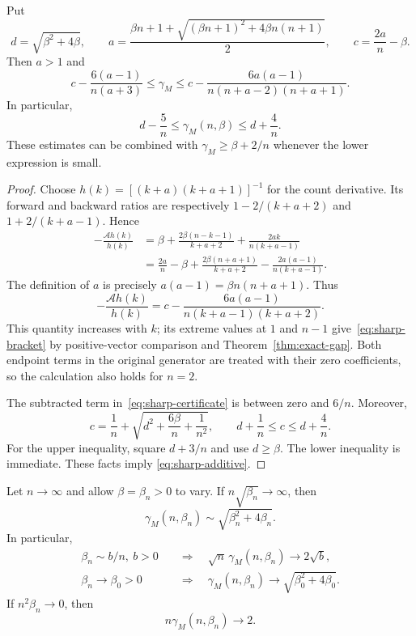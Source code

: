 \begin{theorem}
\label{thm:sharp-gap}
Put
\[
 d=\sqrt{\beta^2+4\beta},\qquad
 a=\frac{\beta n+1+
       \sqrt{(\beta n+1)^2+4\beta n(n+1)}}2,
 \qquad c=\frac{2a}{n}-\beta.
\]
Then $a>1$ and
\begin{equation}\label{eq:sharp-bracket}
 c-\frac{6(a-1)}{n(a+3)}
 \le\gamma_M
 \le c-\frac{6a(a-1)}{n(n+a-2)(n+a+1)}.
\end{equation}
In particular,
\begin{equation}\label{eq:sharp-additive}
 \boxed{\quad d-\frac5n\le\gamma_M(n,\beta)
                     \le d+\frac4n.\quad}
\end{equation}
These estimates can be combined with
$\gamma_M\ge\beta+2/n$ whenever the lower expression is small.
\end{theorem}

\begin{proof}
Choose
$h(k)=[(k+a)(k+a+1)]^{-1}$ for the count derivative.
Its forward and backward ratios are respectively
$1-2/(k+a+2)$ and $1+2/(k+a-1)$. Hence
\begin{align*}
 -\frac{\mathcal Ah(k)}{h(k)}
 &=\beta+\frac{2\beta(n-k-1)}{k+a+2}
                       +\frac{2ak}{n(k+a-1)}\\
 &=\frac{2a}{n}-\beta+
   \frac{2\beta(n+a+1)}{k+a+2}
             -\frac{2a(a-1)}{n(k+a-1)}.
\end{align*}
The definition of $a$ is precisely
$a(a-1)=\beta n(n+a+1)$. Thus
\begin{equation}\label{eq:sharp-certificate}
 -\frac{\mathcal Ah(k)}{h(k)}
 =c-\frac{6a(a-1)}
          {n(k+a-1)(k+a+2)}.
\end{equation}
This quantity increases with $k$; its extreme values at $1$ and
$n-1$ give~\eqref{eq:sharp-bracket} by positive-vector comparison
and Theorem~\ref{thm:exact-gap}. Both endpoint terms in the original
generator are treated with their zero coefficients, so the calculation
also holds for $n=2$.

The subtracted term in~\eqref{eq:sharp-certificate} is between
zero and $6/n$. Moreover,
\[
 c=\frac1n+\sqrt{d^2+\frac{6\beta}{n}+\frac1{n^2}},
 \qquad d+\frac1n\le c\le d+\frac4n.
\]
For the upper inequality, square $d+3/n$ and use $d\ge\beta$.
The lower inequality is immediate. These facts imply
\eqref{eq:sharp-additive}.
\end{proof}

\begin{corollary}\label{cor:sharp-equivalents}
Let $n\to\infty$ and allow $\beta=\beta_n>0$ to vary.
If $n\sqrt{\beta_n}\to\infty$, then
\[
 \gamma_M(n,\beta_n)\sim\sqrt{\beta_n^2+4\beta_n}.
\]
In particular,
\begin{align*}
 \beta_n\sim b/n,\ b>0
 &\quad\Longrightarrow\quad
 \sqrt n\,\gamma_M(n,\beta_n)\longrightarrow2\sqrt b,\\
 \beta_n\longrightarrow\beta_0>0
 &\quad\Longrightarrow\quad
 \gamma_M(n,\beta_n)\longrightarrow\sqrt{\beta_0^2+4\beta_0}.
\end{align*}
If $n^2\beta_n\to0$, then
\[
 n\gamma_M(n,\beta_n)\longrightarrow2.
\]
\end{corollary}

